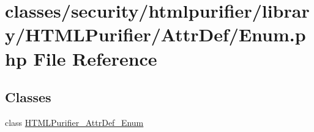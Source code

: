 \hypertarget{Enum_8php}{\section{classes/security/htmlpurifier/library/\+H\+T\+M\+L\+Purifier/\+Attr\+Def/\+Enum.php File Reference}
\label{Enum_8php}
}
\subsection*{Classes}
\begin{DoxyCompactItemize}
\item 
class \hyperlink{classHTMLPurifier__AttrDef__Enum}{H\+T\+M\+L\+Purifier\+\_\+\+Attr\+Def\+\_\+\+Enum}
\end{DoxyCompactItemize}

